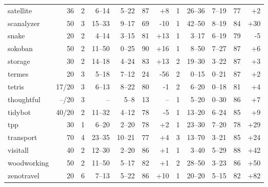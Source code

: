 \documentclass{article}
\begin{document}
\begin{table}
\begin{tabular}{l@{}rr|rrrr|r|rrrr}
    satellite &    36 &   2 &   6--14 &  5--22 & 87 &  {\color{blue}+8} &   1 &   26--36 &  7--19 & 77 &  {\color{blue}+2} \\
   scanalyzer &    50 &   3 &  15--33 &  9--17 & 69 &  {\color{red}-10} &   1 &   42--50 &  8--19 & 84 & {\color{blue}+30} \\
        snake &    20 &   2 &   4--14 &  3--15 & 81 & {\color{blue}+13} &   1 &    3--17 &  6--19 & 79 &   {\color{red}-5} \\
      sokoban &    50 &   2 &  11--50 &  0--25 & 90 & {\color{blue}+16} &   1 &    8--50 &  7--27 & 87 &  {\color{blue}+6} \\
      storage &    30 &   2 &  14--18 &  4--24 & 83 & {\color{blue}+13} &   2 &   19--30 &  3--22 & 87 &  {\color{blue}+3} \\
       termes &    20 &   3 &   5--18 &  7--12 & 24 &  {\color{red}-56} &   2 &    0--15 &  0--21 & 87 &  {\color{blue}+2} \\
       tetris & 17/20 &   3 &   6--13 &  8--22 & 80 &   {\color{red}-1} &   2 &    6--20 &  0--18 & 81 &  {\color{blue}+4} \\
   thoughtful & --/20 &   3 &      -- &   5--8 & 13 &                -- &   1 &    5--20 &  0--30 & 86 &  {\color{blue}+7} \\
      tidybot & 40/20 &   2 &  11--32 &  4--12 & 78 &   {\color{red}-5} &   1 &   13--20 &  6--24 & 85 &  {\color{blue}+9} \\
          tpp &    30 &   1 &   6--20 &  2--20 & 78 &  {\color{blue}+2} &   1 &   23--30 &  7--20 & 78 & {\color{blue}+29} \\
    transport &    70 &   4 &  23--35 & 10--21 & 77 &  {\color{blue}+4} &   3 &   13--70 &  3--21 & 85 & {\color{blue}+24} \\
     visitall &    40 &   2 &  12--30 &  2--20 & 86 &  {\color{blue}+1} &   1 &    3--40 &  5--29 & 88 & {\color{blue}+42} \\
  woodworking &    50 &   2 &  11--50 &  5--17 & 82 &  {\color{blue}+1} &   2 &   28--50 &  3--23 & 86 & {\color{blue}+50} \\
   zenotravel &    20 &   6 &   7--13 &  5--22 & 86 & {\color{blue}+10} &   1 &   20--20 &  5--15 & 82 & {\color{blue}+82} \\
\bottomrule
\end{tabular}

            \end{table}
            
\end{document}

